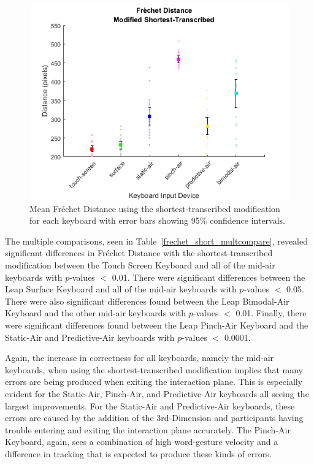 \begin{figure}[h]
	\centering
	\includegraphics{fig_frechet_short_mean}
	\caption[Mean Fr\'echet Distance for Modified-Shortest]{Mean Fr\'echet Distance using the shortest-transcribed modification for each keyboard with error bars showing 95\% confidence intervals.}
	\label{fig_frechet_short_mean}
\end{figure}

The multiple comparisons, seen in Table~\ref{frechet_short_multcompare}, revealed significant differences in Fr\'echet Distance with the shortest-transcribed modification between the Touch Screen Keyboard and all of the mid-air keyboards with $p$-values $<$ 0.01. There were significant differences between the Leap Surface Keyboard and all of the mid-air keyboards with $p$-values $<$ 0.05. There were also significant differences found between the Leap Bimodal-Air Keyboard and the other mid-air keyboards with $p$-values $<$ 0.01. Finally, there were significant differences found between the Leap Pinch-Air Keyboard and the Static-Air and Predictive-Air keyboards with $p$-values $<$ 0.0001.

Again, the increase in correctness for all keyboards, namely the mid-air keyboards, when using the shortest-transcribed modification implies that many errors are being produced when exiting the interaction plane. This is especially evident for the Static-Air, Pinch-Air, and Predictive-Air keyboards all seeing the largest improvements. For the Static-Air and Predictive-Air keyboards, these errors are caused by the addition of the 3rd-Dimension and participants having trouble entering and exiting the interaction plane accurately. The Pinch-Air Keyboard, again, sees a combination of high word-gesture velocity and a difference in tracking that is expected to produce these kinds of errors.

